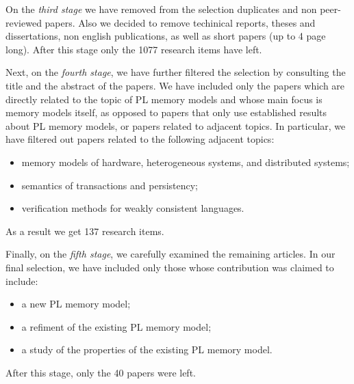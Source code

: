 On the \emph{third stage} we have removed from the selection duplicates and non peer-reviewed papers. 
Also we decided to remove techinical reports, theses and dissertations, 
non english publications, as well as short papers (up to 4 page long).
After this stage only the 1077 research items have left.

Next, on the \emph{fourth stage}, we have further filtered the selection 
by consulting the title and the abstract of the papers. 
We have included only the papers which are directly related to the 
topic of PL memory models and whose main focus is memory models itself,
as opposed to papers that only use established results about PL memory models,
or papers related to adjacent topics. 
In particular, we have filtered out papers related to the following adjacent topics:
\begin{itemize}
  \item memory models of hardware, heterogeneous systems, and distributed systems;
  \item semantics of transactions and persistency;
  \item verification methods for weakly consistent languages.
\end{itemize}
As a result we get 137 research items.

Finally, on the \emph{fifth stage}, we carefully examined the remaining articles.
In our final selection, we have included only those whose contribution was claimed to include:
\begin{itemize}
  \item a new PL memory model;
  \item a refiment of the existing PL memory model;
  \item a study of the properties of the existing PL memory model.
\end{itemize}
After this stage, only the 40 papers were left.


  

